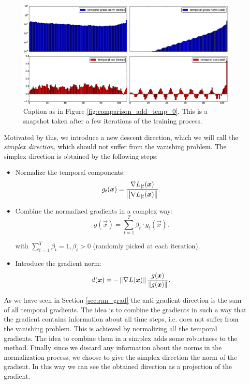 \begin{figure}[h]
	\includegraphics[width=1\textwidth]{chapter3/compare_add_temp_norms_1.eps}
	\caption{Caption as in Figure \ref{fig:comparison_add_temp_0}. This is a snapshot taken after a few iterations of the training process.}
	\label{fig:comparison_add_temp_1}
\end{figure}


Motivated by this, we introduce a new descent direction, which we will call the \textit{simplex direction},
which should not suffer from the vanishing problem. The simplex direction is obtained by the following steps:


\begin{itemize}
	\item Normalize the temporal components:
	\begin{equation}
	g_t(\boldsymbol{x}) = \frac{\nabla L_{|t}(\boldsymbol{x})}{\left\Vert \nabla L_{|t}(\boldsymbol{x}) \right\Vert}.
	\end{equation}
	
	\item Combine the normalized gradients in a complex way:
	\begin{equation}
	g(\vec{x}) = \sum_{t=1}^T \beta_t \cdot g_t(\vec{x}).
	\end{equation}
	
	with $\sum_{t=1}^T\beta_t=1, \beta_t>0$ (randomly picked at each iteration).
	\item Introduce the gradient norm:
	\begin{equation}
	d(\boldsymbol{x}) = - \left\Vert \nabla L (\boldsymbol{x}) \right\Vert\frac{g(\boldsymbol{x})}{\left\Vert g(\boldsymbol{x}) \right\Vert}.
	\end{equation}
\end{itemize}

As we have seen in Section \ref{sec:rnn_grad} the anti-gradient direction is the sum of all temporal gradients. The idea is to combine the gradients in such a way that the gradient contains information about all time steps, i.e. does not suffer from the vanishing problem. This is achieved by normalizing all the temporal gradients. The idea to combine them in a simplex adds some robustness to the method. Finally since we discard any information about the norms in the normalization process, we choose to give the simplex direction the norm of the gradient. In this way we can see the obtained direction as a projection of the gradient.


